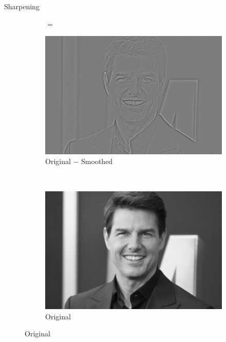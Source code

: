 \begin{frame}{Sharpening}
\begin{figure}
\begin{subfigure}[b]{0.25\textwidth}
        \end{subfigure}
        \begin{subfigure}[b]{0.05\textwidth}
            \centering
            $=$
            \vspace{2cm}
        \end{subfigure}
        \begin{subfigure}[b]{0.25\textwidth}
            \includegraphics[width=\textwidth]{./figures/sharpening_diff.jpg}
            \caption{Original $-$ Smoothed}
            \label{sfi:sharpening_diff}
        \end{subfigure}\\
        \centering
        \begin{subfigure}[b]{0.25\textwidth}
            \includegraphics[width=\textwidth]{./figures/sharpening_original.jpg}
            \caption{Original}
            \label{sfi:sharpening_original_1}

\end{subfigure}
\end{figure}
\end{frame}
